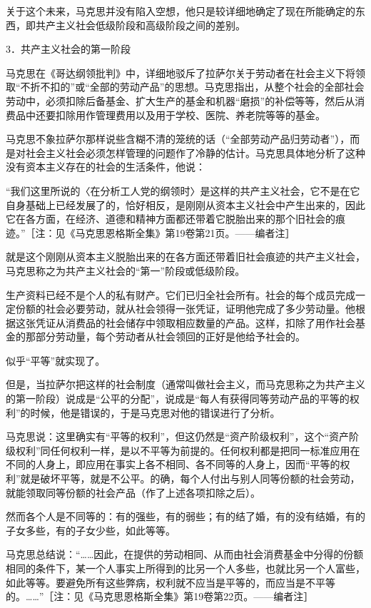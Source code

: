 \documentclass[UTF8, 12pt, a4paper]{ctexrep}
\begin{document}
关于这个未来，马克思并没有陷入空想，他只是较详细地确定了现在所能确定的东西，即共产主义社会低级阶段和高级阶段之间的差别。

3．共产主义社会的第一阶段

马克思在《哥达纲领批判》中，详细地驳斥了拉萨尔关于劳动者在社会主义下将领取“不折不扣的”或“全部的劳动产品”的思想。马克思指出，从整个社会的全部社会劳动中，必须扣除后备基金、扩大生产的基金和机器“磨损”的补偿等等，然后从消费品中还要扣除用作管理费用以及用于学校、医院、养老院等等的基金。

马克思不象拉萨尔那样说些含糊不清的笼统的话（“全部劳动产品归劳动者”），而是对社会主义社会必须怎样管理的问题作了冷静的估计。马克思具体地分析了这种没有资本主义存在的社会的生活条件，他说：

“我们这里所说的〈在分析工人党的纲领时〉是这样的共产主义社会，它不是在它自身基础上已经发展了的，恰好相反，是刚刚从资本主义社会中产生出来的，因此它在各方面，在经济、道德和精神方面都还带着它脱胎出来的那个旧社会的痕迹。”［注：见《马克思恩格斯全集》第19卷第21页。——编者注］

就是这个刚刚从资本主义脱胎出来的在各方面还带着旧社会痕迹的共产主义社会，马克思称之为共产主义社会的“第一”阶段或低级阶段。

生产资料已经不是个人的私有财产。它们已归全社会所有。社会的每个成员完成一定份额的社会必要劳动，就从社会领得一张凭证，证明他完成了多少劳动量。他根据这张凭证从消费品的社会储存中领取相应数量的产品。这样，扣除了用作社会基金的那部分劳动量，每个劳动者从社会领回的正好是他给予社会的。

似乎“平等”就实现了。

但是，当拉萨尔把这样的社会制度（通常叫做社会主义，而马克思称之为共产主义的第一阶段）说成是“公平的分配”，说成是“每人有获得同等劳动产品的平等的权利”的时候，他是错误的，于是马克思对他的错误进行了分析。

马克思说：这里确实有“平等的权利”，但这仍然是“资产阶级权利”，这个“资产阶级权利”同任何权利一样，是以不平等为前提的。任何权利都是把同一标准应用在不同的人身上，即应用在事实上各不相同、各不同等的人身上，因而“平等的权利”就是破坏平等，就是不公平。的确，每个人付出与别人同等份额的社会劳动，就能领取同等份额的社会产品（作了上述各项扣除之后）。

然而各个人是不同等的：有的强些，有的弱些；有的结了婚，有的没有结婚，有的子女多些，有的子女少些，如此等等。

马克思总结说：“……因此，在提供的劳动相同、从而由社会消费基金中分得的份额相同的条件下，某一个人事实上所得到的比另一个人多些，也就比另一个人富些，如此等等。要避免所有这些弊病，权利就不应当是平等的，而应当是不平等的。……”［注：见《马克思恩格斯全集》第19卷第22页。——编者注］
\end{document}
